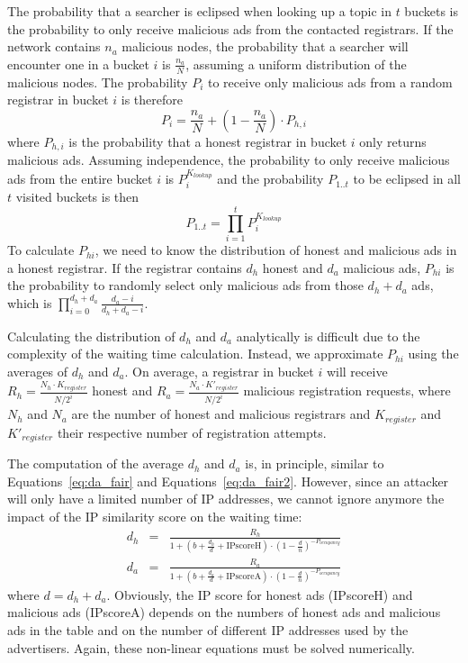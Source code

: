 The probability that a searcher is eclipsed when looking up a topic in $t$ buckets is the probability to only receive malicious ads from the contacted registrars. If the network contains $n_a$ malicious nodes, the probability that a searcher will encounter one in a bucket $i$ is $\frac{n_a}{N}$, assuming a uniform distribution of the malicious nodes.
The probability $P_i$ to receive only malicious ads from a random registrar in bucket $i$ is therefore
$$ P_{i} = \frac{n_a}{N} + (1-\frac{n_a}{N}) \cdot P_{h,i}$$
where $P_{h,i}$ is the probability that a honest registrar in bucket $i$ only returns malicious ads.
Assuming independence, the probability to only receive malicious ads from the entire bucket $i$ is $P_{i}^{K_{lookup}}$ and the probability $P_{1..t}$ to be eclipsed in all $t$ visited buckets is then
$$ P_{1..t} = \prod_{i=1}^{t} P_{i}^{K_{lookup}}$$
To calculate $P_{hi}$, we need to know the distribution of honest and malicious ads in a honest registrar.
If the registrar contains $d_h$ honest and $d_a$ malicious ads, $P_{hi}$ is the probability to randomly select only malicious ads from those $d_h+d_a$ ads, which is $\prod_{i=0}^{d_h+d_a} \frac{d_a - i}{d_h+d_a-i}$.

Calculating the distribution of $d_h$ and $d_a$ analytically is difficult due to the complexity of the waiting time calculation. Instead, we approximate $P_{hi}$ using the averages of $d_h$ and $d_a$.
On average, a registrar in bucket $i$ will receive $R_h = \frac{N_h\cdot K_{register}}{N/2^i}$ honest and $R_a = \frac{N_a\cdot K'_{register}}{N/2^i}$ malicious registration requests, where $N_h$ and $N_a$ are the number of honest and malicious registrars and $K_{register}$ and $K'_{register}$ their respective number of registration attempts.

The computation of the average $d_h$ and $d_a$ is, in principle, similar to Equations~\ref{eq:da_fair} and Equations~\ref{eq:da_fair2}. However, since an attacker will only have a limited number of IP addresses, we cannot ignore anymore the impact of the IP similarity score on the waiting time:
\begin{eqnarray}
d_h & = & \frac{R_h}{1 + (b + \frac{d_h}{d} + \mbox{IPscoreH}) \cdot (1 - \frac{d}{n})^{-P_{occupancy}}}\\
d_a & = & \frac{R_a}{1 + (b + \frac{d_a}{d} + \mbox{IPscoreA}) \cdot (1 - \frac{d}{n})^{-P_{occupancy}}}
\end{eqnarray}
where $d = d_h + d_a$. Obviously, the IP score for honest ads (IPscoreH) and malicious ads (IPscoreA) depends on the numbers of honest ads and malicious ads in the table and on the number of different IP addresses used by the advertisers. Again, these non-linear equations must be solved numerically.


